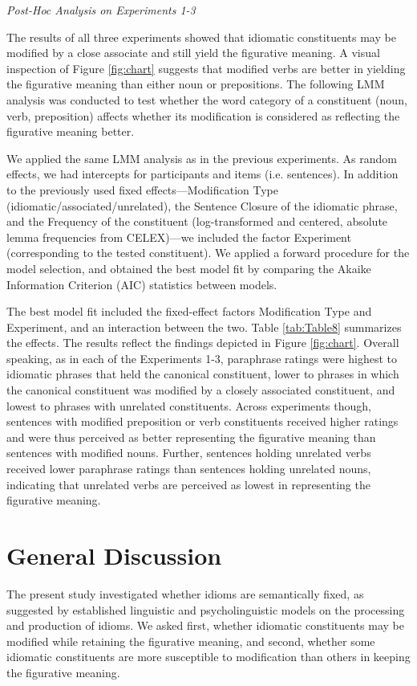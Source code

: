 \documentclass[output=paper]{langsci/langscibook}
\begin{document}
\textit{Post-Hoc Analysis on Experiments 1-3}

The results of all three experiments showed that idiomatic constituents may be modified by a close associate and still yield the figurative meaning. A visual inspection of Figure \ref{fig:chart} suggests that modified verbs are better in yielding the figurative meaning than either noun or prepositions. The following LMM analysis was conducted to test whether the word category of a constituent (noun, verb, preposition) affects whether its modification is considered as reflecting the figurative meaning better. 

We applied the same LMM analysis as in the previous experiments. As random effects, we had intercepts for participants and items (i.e. sentences). In addition to the previously used fixed effects—Modification Type (idiomatic/associated/unrelated), the Sentence Closure of the idiomatic phrase, and the Frequency of the constituent (log-transformed and centered, absolute lemma frequencies from CELEX)—we included the factor Experiment (corresponding to the tested constituent).  We applied a forward procedure for the model selection, and obtained the best model fit by comparing the Akaike Information Criterion (AIC) statistics between models. 

The best model fit included the fixed-effect factors Modification Type and Experiment, and an interaction between the two.  Table \ref{tab:Table8} summarizes the effects. The results reflect the findings depicted in Figure \ref{fig:chart}.  Overall speaking, as in each of the Experiments 1-3, paraphrase ratings were highest to idiomatic phrases that held the canonical constituent, lower to phrases in which the canonical constituent was modified by a closely associated constituent, and lowest to phrases with unrelated constituents. Across experiments though, sentences with modified preposition or verb constituents received higher ratings and were thus perceived as better representing the figurative meaning than sentences with modified nouns. Further, sentences holding unrelated verbs received lower paraphrase ratings than sentences holding unrelated nouns, indicating that unrelated verbs are perceived as lowest in representing the figurative meaning. 

\section{General Discussion}
The present study investigated whether idioms are semantically fixed, as suggested by established linguistic and psycholinguistic models on the processing and production of idioms. We asked first, whether idiomatic constituents may be modified while retaining the figurative meaning, and second, whether some idiomatic constituents are more susceptible to modification than others in keeping the figurative meaning. 
\end{document}
